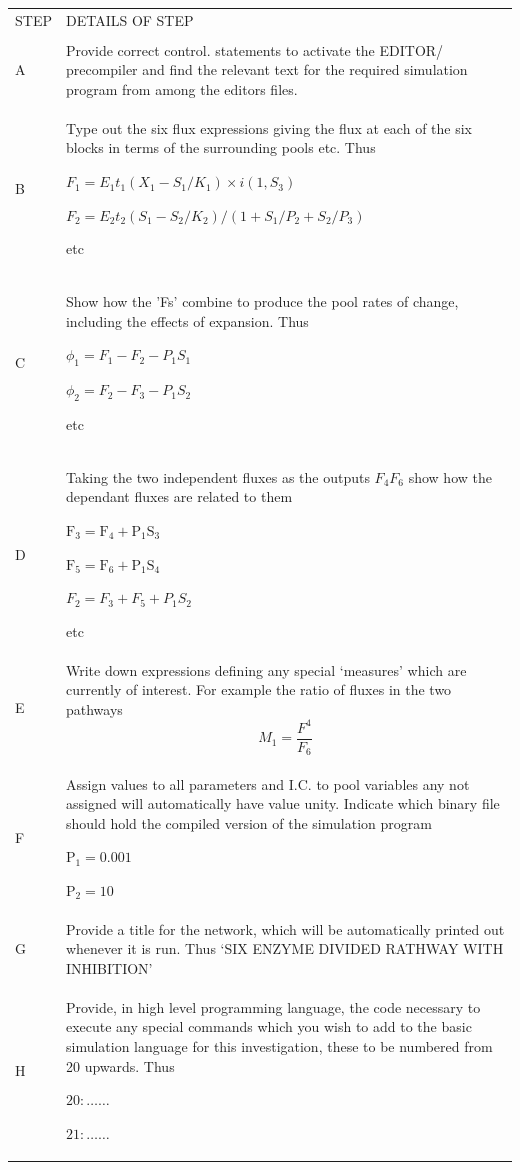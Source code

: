 {\renewcommand{\arraystretch}{2}
\begin{tabular}{lp{10cm}}
STEP & DETAILS OF STEP \\ \\
A & Provide correct control. statements to activate the EDITOR/
precompiler and find the relevant text for the required
simulation program from among the editors files. \\
%
B &
Type out the six flux expressions giving the flux at each of the six blocks in terms of the surrounding pools etc. Thus

$F_{1}=E_{1} t_{1}\left(X_{1}-S_{1} / K_{1}\right) \times i\left(1, S_{3}\right)$

$ F_{2} = E_{2} t_{2}\left(S_{1}- S_{2} / K_{2}\right) / \left(1 + S_{1} / P_{2}+ S_{2} / P_{3}\right)$

etc \\
%
C &
Show how the 'Fs' combine to produce the pool rates of change, including the effects of expansion. Thus

$\phi_{1}=F_{1}-F_{2}-P_{1} S_{1}$

$\phi_{2}=F_{2}-F_{3}-P_{1} S_{2}$

etc \\
D &
Taking the two independent fluxes as the outputs $F_{4} F_{6}$ show how the dependant fluxes are related to them

$\mathrm{F}_{3}=\mathrm{F}_{4}+\mathrm{P}_{1} \mathrm{S}_{3}$

$\mathrm{F}_{5}=\mathrm{F}_{6}+\mathrm{P}_{1} \mathrm{S}_{4}$

$F_{2}=F_{3}+F_{5}+P_{1} S_{2}$

etc \\
%
E &
Write down expressions defining any special `measures'
which are currently of interest. For example the ratio
of fluxes in the two pathways
%
$$ M_{1}=\frac{F^{4}}{F_{6}} $$ \\
%
F &
Assign values to all parameters and I.C. to pool
variables any not assigned will automatically have
value unity. Indicate which binary file should hold
the compiled version of the simulation program

$ \mathrm{P}_{1}=0.001 $

$ \mathrm{P}_{2}=10 $ \\
%
G &
Provide a title for the network, which will be automatically printed out whenever it is run. Thus
`SIX ENZYME DIVIDED RATHWAY WITH INHIBITION' \\
%
H &
Provide, in high level programming language, the code necessary to execute any special commands which you wish to add to the basic simulation language for this investigation, these to be numbered from 20 upwards. Thus

$ 20: \ldots\ldots $

$ 21: \ldots\ldots $
\end{tabular}}


